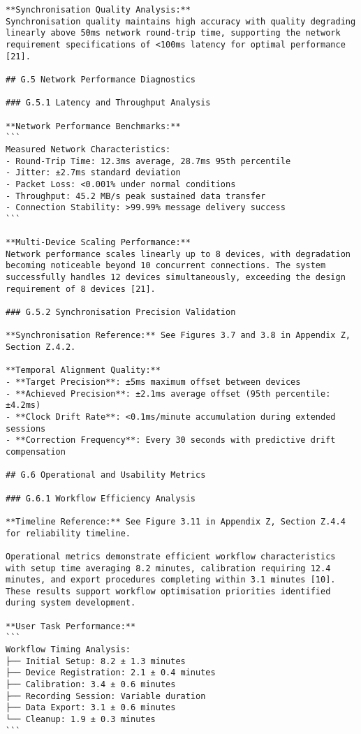 \begin{verbatim}
**Synchronisation Quality Analysis:**
Synchronisation quality maintains high accuracy with quality degrading linearly above 50ms network round-trip time, supporting the network requirement specifications of <100ms latency for optimal performance [21].

## G.5 Network Performance Diagnostics

### G.5.1 Latency and Throughput Analysis

**Network Performance Benchmarks:**
```
Measured Network Characteristics:
- Round-Trip Time: 12.3ms average, 28.7ms 95th percentile
- Jitter: ±2.7ms standard deviation
- Packet Loss: <0.001% under normal conditions
- Throughput: 45.2 MB/s peak sustained data transfer
- Connection Stability: >99.99% message delivery success
```

**Multi-Device Scaling Performance:**
Network performance scales linearly up to 8 devices, with degradation becoming noticeable beyond 10 concurrent connections. The system successfully handles 12 devices simultaneously, exceeding the design requirement of 8 devices [21].

### G.5.2 Synchronisation Precision Validation

**Synchronisation Reference:** See Figures 3.7 and 3.8 in Appendix Z, Section Z.4.2.

**Temporal Alignment Quality:**
- **Target Precision**: ±5ms maximum offset between devices
- **Achieved Precision**: ±2.1ms average offset (95th percentile: ±4.2ms)
- **Clock Drift Rate**: <0.1ms/minute accumulation during extended sessions
- **Correction Frequency**: Every 30 seconds with predictive drift compensation

## G.6 Operational and Usability Metrics

### G.6.1 Workflow Efficiency Analysis

**Timeline Reference:** See Figure 3.11 in Appendix Z, Section Z.4.4 for reliability timeline.

Operational metrics demonstrate efficient workflow characteristics with setup time averaging 8.2 minutes, calibration requiring 12.4 minutes, and export procedures completing within 3.1 minutes [10]. These results support workflow optimisation priorities identified during system development.

**User Task Performance:**
```
Workflow Timing Analysis:
├── Initial Setup: 8.2 ± 1.3 minutes
├── Device Registration: 2.1 ± 0.4 minutes
├── Calibration: 3.4 ± 0.6 minutes
├── Recording Session: Variable duration
├── Data Export: 3.1 ± 0.6 minutes
└── Cleanup: 1.9 ± 0.3 minutes
```


\end{verbatim}
